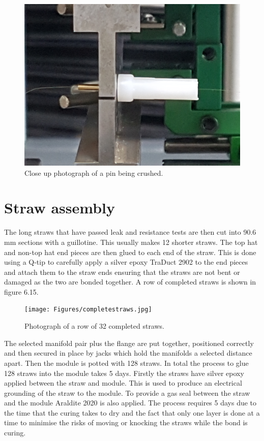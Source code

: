 \begin{figure}[!h]
\centering 
\includegraphics[scale=0.08]{Figures/pincrush.jpg}
\decoRule
\caption{Close up photograph of a pin being crushed.}
\label{fig:pincrush}
\end{figure}

\section{Straw assembly}
The long straws that have passed leak and resistance tests are then cut into 90.6 mm sections with a guillotine. This usually makes 12 shorter straws. The top hat and non-top hat end pieces are then glued to each end of the straw. This is done using a Q-tip to carefully apply a silver epoxy TraDuct 2902 \cite{silverepoxy} to the end pieces and attach them to the straw ends ensuring that the straws are not bent or damaged as the two are bonded together. A row of completed straws is shown in figure 6.15.

\begin{figure}[!h]
\centering 
\texttt{[image: Figures/completestraws.jpg]}
\decoRule
\caption{Photograph of a row of 32 completed straws.}
\label{fig:completestraws}
\end{figure}

The selected manifold pair plus the flange are put together, positioned correctly and then secured in place by jacks which hold the manifolds a selected distance apart. Then the module is potted with 128 straws. In total the process to glue 128 straws into the module takes 5 days. Firstly the straws have silver epoxy applied between the straw and module. This is used to produce an electrical grounding of the straw to the module. To provide a gas seal between the straw and the module Araldite 2020 is also applied. The process requires 5 days due to the time that the curing takes to dry and the fact that only one layer is done at a time to minimise the risks of moving or knocking the straws while the bond is curing.

